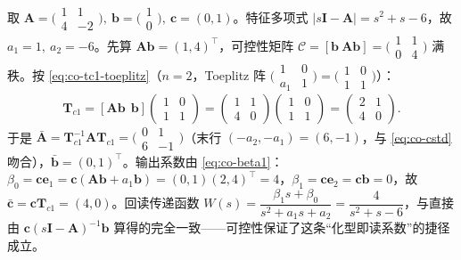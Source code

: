 \begin{example}\label{ex:co-canon-transform}
取 $\mathbf{A}=\big(\begin{smallmatrix}1&1\\4&-2\end{smallmatrix}\big),\ \mathbf{b}=\big(\begin{smallmatrix}1\\0\end{smallmatrix}\big),\ \mathbf{c}=(0,1)$。特征多项式 $|s\mathbf{I}-\mathbf{A}|=s^2+s-6$，故 $a_1=1,\ a_2=-6$。先算 $\mathbf{A}\mathbf{b}=(1,4)^\top$，可控性矩阵 $\mathcal{C}=[\mathbf{b}\ \mathbf{A}\mathbf{b}]=\big(\begin{smallmatrix}1&1\\0&4\end{smallmatrix}\big)$ 满秩。按 \cref{eq:co-tc1-toeplitz}（$n=2$，Toeplitz 阵 $\big(\begin{smallmatrix}1&0\\a_1&1\end{smallmatrix}\big)=\big(\begin{smallmatrix}1&0\\1&1\end{smallmatrix}\big)$）：
\[
  \mathbf{T}_{c1}=[\mathbf{A}\mathbf{b}\ \ \mathbf{b}]\begin{pmatrix}1&0\\1&1\end{pmatrix}
  =\begin{pmatrix}1&1\\4&0\end{pmatrix}\begin{pmatrix}1&0\\1&1\end{pmatrix}=\begin{pmatrix}2&1\\4&0\end{pmatrix}.
\]
于是 $\bar{\mathbf{A}}=\mathbf{T}_{c1}^{-1}\mathbf{A}\mathbf{T}_{c1}=\big(\begin{smallmatrix}0&1\\6&-1\end{smallmatrix}\big)$（末行 $(-a_2,-a_1)=(6,-1)$，与 \cref{eq:co-cstd} 吻合），$\bar{\mathbf{b}}=(0,1)^\top$。输出系数由 \cref{eq:co-beta1}：$\beta_0=\mathbf{c}\mathbf{e}_1=\mathbf{c}(\mathbf{A}\mathbf{b}+a_1\mathbf{b})=(0,1)(2,4)^\top=4$，$\beta_1=\mathbf{c}\mathbf{e}_2=\mathbf{c}\mathbf{b}=0$，故 $\bar{\mathbf{c}}=\mathbf{c}\mathbf{T}_{c1}=(4,0)$。回读传递函数 $W(s)=\dfrac{\beta_1 s+\beta_0}{s^2+a_1 s+a_2}=\dfrac{4}{s^2+s-6}$，与直接由 $\mathbf{c}(s\mathbf{I}-\mathbf{A})^{-1}\mathbf{b}$ 算得的完全一致——可控性保证了这条“化型即读系数”的捷径成立。
\end{example}

